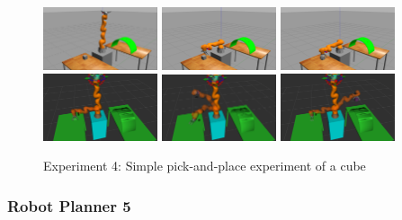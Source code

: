 \begin{center}
\begin{figure}[H]
\centering
\includegraphics[width=0.3\textwidth]{images/robot_planner4/robot_planner4_1}
\includegraphics[width=0.3\textwidth]{images/robot_planner4/robot_planner4_3}
\includegraphics[width=0.3\textwidth]{images/robot_planner4/robot_planner4_5}\\
\includegraphics[width=0.3\textwidth]{images/robot_planner4/robot_planner4_6}
\includegraphics[width=0.3\textwidth]{images/robot_planner4/robot_planner4_8}
\includegraphics[width=0.3\textwidth]{images/robot_planner4/robot_planner4_10}\\
\caption{Experiment 4: Simple pick-and-place experiment of a cube}
\end{figure}
\end{center}


\subsubsection{Robot Planner 5}

